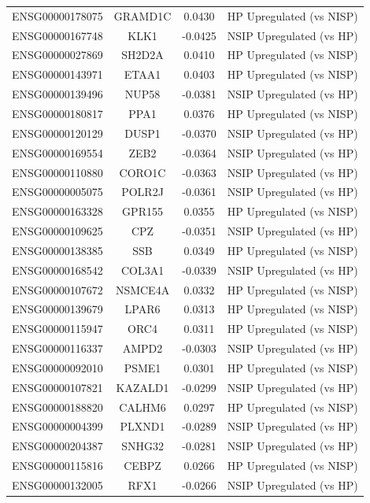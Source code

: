 \documentclass[
]{article}
\begin{document}
\begin{singlespace}
\begin{longtable}[t]{lccc}
\addlinespace
ENSG00000178075 & GRAMD1C & 0.0430 & HP Upregulated (vs NISP)\\
ENSG00000167748 & KLK1 & -0.0425 & NSIP Upregulated (vs HP)\\
ENSG00000027869 & SH2D2A & 0.0410 & HP Upregulated (vs NISP)\\
ENSG00000143971 & ETAA1 & 0.0403 & HP Upregulated (vs NISP)\\
ENSG00000139496 & NUP58 & -0.0381 & NSIP Upregulated (vs HP)\\
\addlinespace
ENSG00000180817 & PPA1 & 0.0376 & HP Upregulated (vs NISP)\\
ENSG00000120129 & DUSP1 & -0.0370 & NSIP Upregulated (vs HP)\\
ENSG00000169554 & ZEB2 & -0.0364 & NSIP Upregulated (vs HP)\\
ENSG00000110880 & CORO1C & -0.0363 & NSIP Upregulated (vs HP)\\
ENSG00000005075 & POLR2J & -0.0361 & NSIP Upregulated (vs HP)\\
\addlinespace
ENSG00000163328 & GPR155 & 0.0355 & HP Upregulated (vs NISP)\\
ENSG00000109625 & CPZ & -0.0351 & NSIP Upregulated (vs HP)\\
ENSG00000138385 & SSB & 0.0349 & HP Upregulated (vs NISP)\\
ENSG00000168542 & COL3A1 & -0.0339 & NSIP Upregulated (vs HP)\\
ENSG00000107672 & NSMCE4A & 0.0332 & HP Upregulated (vs NISP)\\
\addlinespace
ENSG00000139679 & LPAR6 & 0.0313 & HP Upregulated (vs NISP)\\
ENSG00000115947 & ORC4 & 0.0311 & HP Upregulated (vs NISP)\\
ENSG00000116337 & AMPD2 & -0.0303 & NSIP Upregulated (vs HP)\\
ENSG00000092010 & PSME1 & 0.0301 & HP Upregulated (vs NISP)\\
ENSG00000107821 & KAZALD1 & -0.0299 & NSIP Upregulated (vs HP)\\
\addlinespace
ENSG00000188820 & CALHM6 & 0.0297 & HP Upregulated (vs NISP)\\
ENSG00000004399 & PLXND1 & -0.0289 & NSIP Upregulated (vs HP)\\
ENSG00000204387 & SNHG32 & -0.0281 & NSIP Upregulated (vs HP)\\
ENSG00000115816 & CEBPZ & 0.0266 & HP Upregulated (vs NISP)\\
ENSG00000132005 & RFX1 & -0.0266 & NSIP Upregulated (vs HP)\\

\end{longtable}
\end{singlespace}
\end{document}
